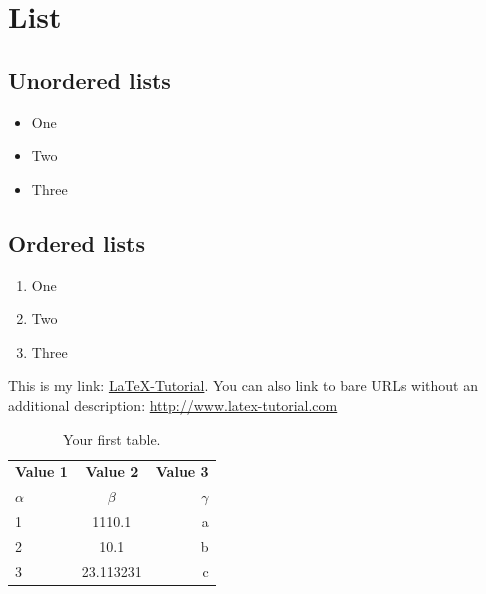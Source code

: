 \documentclass{article}
\begin{document}
	\section{List}
	\subsection{Unordered lists}
	\begin{itemize}
		\item One
		\item Two
		\item Three
	\end{itemize}

	\subsection{Ordered lists}
	\begin{enumerate}
		\item One
		\item Two
		\item Three
	\end{enumerate}

	This is my link: \href{http://www.latex-tutorial.com}{LaTeX-Tutorial}.
	You can also link to bare URLs without an additional description: \url{http://www.latex-tutorial.com}

	\begin{table}[h!]
  		\begin{center}
    			\caption{Your first table.}
    			\label{tab:table1}
   		 \begin{tabular}{l|c|r} %
     			 \textbf{Value 1} & \textbf{Value 2} & \textbf{Value 3}\\
      			$\alpha$ & $\beta$ & $\gamma$ \\
     			 \hline
      			1 & 1110.1 & a\\
      			2 & 10.1 & b\\
			\hline
      			3 & 23.113231 & c\\
    		\end{tabular}
 	 	\end{center}
	\end{table}
	
\end{document}

